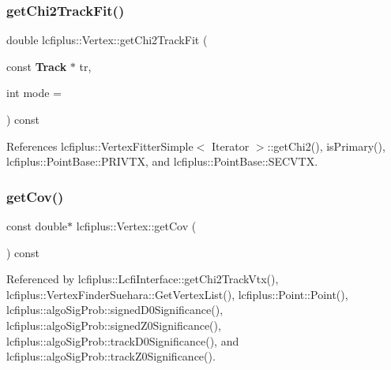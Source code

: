 \mbox{\label{classlcfiplus_1_1Vertex_aa08ee916b5d9f78a2a8d3d51fee3ab86}} 
\subsubsection{get\+Chi2\+Track\+Fit()}
{\footnotesize\ttfamily double lcfiplus\+::\+Vertex\+::get\+Chi2\+Track\+Fit (\begin{DoxyParamCaption}\item[{const \textbf{ Track} $\ast$}]{tr,  }\item[{int}]{mode = {} }\end{DoxyParamCaption}) const}



References lcfiplus\+::\+Vertex\+Fitter\+Simple$<$ Iterator $>$\+::get\+Chi2(), is\+Primary(), lcfiplus\+::\+Point\+Base\+::\+P\+R\+I\+V\+TX, and lcfiplus\+::\+Point\+Base\+::\+S\+E\+C\+V\+TX.

\mbox{\label{classlcfiplus_1_1Vertex_a546892ca4acec40fce547a014c1596aa}} 
\subsubsection{get\+Cov()}
{\footnotesize\ttfamily const double$\ast$ lcfiplus\+::\+Vertex\+::get\+Cov (\begin{DoxyParamCaption}{ }\end{DoxyParamCaption}) const\hspace{0.3cm}{\ttfamily [inline]}}



Referenced by lcfiplus\+::\+Lcfi\+Interface\+::get\+Chi2\+Track\+Vtx(), lcfiplus\+::\+Vertex\+Finder\+Suehara\+::\+Get\+Vertex\+List(), lcfiplus\+::\+Point\+::\+Point(), lcfiplus\+::algo\+Sig\+Prob\+::signed\+D0\+Significance(), lcfiplus\+::algo\+Sig\+Prob\+::signed\+Z0\+Significance(), lcfiplus\+::algo\+Sig\+Prob\+::track\+D0\+Significance(), and lcfiplus\+::algo\+Sig\+Prob\+::track\+Z0\+Significance().

\mbox{\label{classlcfiplus_1_1Vertex_af20772a8b97ec33124fc3c1096c3cd58}} 
